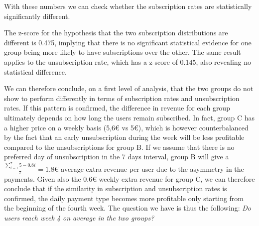 \documentclass[paper=a4, fontsize=10pt]{report}
\begin{document}
With these numbers we can check whether the subscription rates are statistically significantly different.

The z-score for the hypothesis that the two subscription distributions are different is 0.475, implying that there is no significant statistical evidence for one group being more likely to have
subscriptions over the other. The same result applies to the unsubscription rate, which has a z score of 0.145, also revealing no statistical difference.

We can therefore conclude, on a first level of analysis, that the two groups do not show to perform differently in terms of subscription rates and unsubscription rates. If this 
pattern is confirmed, the difference in revenue for each group ultimately depends on how long the users remain subscribed. In fact, group C has a higher
price on a weekly basis (5,6€ vs 5€), which is
however counterbalanced by the fact that an early unsubscription during the week will be less profitable compared to the unsubscriptions for group B. 
If we assume that there is no preferred day of unsubscription in the 7 days interval, group B will give a $ \frac{\sum_{i=1}^{7} 5-0.8i}{7} =1.8$€ average
extra revenue per user due to the asymmetry in the payments. Given also the 0.6€ weekly extra revenue for group C, we can therefore conclude that if the similarity 
in subscription and
unsubscription rates is confirmed, the daily payment type becomes more profitable only starting from the beginning of the fourth week. The question we have is thus the following: \textit{Do users reach week 4 on average in the two groups?}
\end{document}

